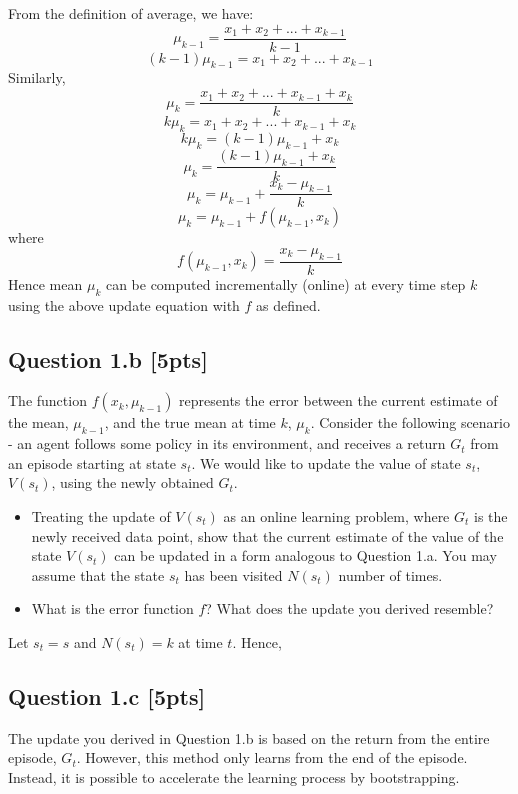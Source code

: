 \documentclass[12pt]{article}
\begin{document}
\noindent
\begin{solution}
From the definition of average, we have:
$$\mu_{k-1} = \frac{x_1 + x_2 + ... + x_{k-1} }{k-1}$$
$$(k-1)\mu_{k-1} = x_1 + x_2 + ... + x_{k-1}$$
Similarly, 
$$\mu_{k} = \frac{x_1 + x_2 + ... + x_{k-1} + x_k}{k}$$
$$k\mu_{k} = x_1 + x_2 + ... + x_{k-1} + x_k$$
$$k\mu_{k} = (k-1)\mu_{k-1} + x_k$$
$$\mu_{k} = \frac{(k-1)\mu_{k-1} + x_k}{k}$$
$$\mu_{k} = \mu_{k-1} + \frac{x_k - \mu_{k-1}}{k}$$
$$\mu_{k} = \mu_{k-1} + f(\mu_{k-1}, x_k)$$
where
$$f(\mu_{k-1}, x_k) = \frac{x_k - \mu_{k-1}}{k}$$
Hence mean $\mu_k$ can be computed  incrementally (online) at every time step $k$ using the above update equation with $f$ as defined.
\end{solution}

\subsection*{Question 1.b \textbf{[5pts]}}
The function $f(x_k, \mu_{k-1})$ represents the error between the current estimate of the mean, $\mu_{k-1}$, and the true mean at time $k$, $\mu_k$. Consider the following scenario - an agent follows some policy in its environment, and receives a return $G_t$ from an episode starting at state $s_t$. We would like to update the value of state $s_t$, $V(s_t)$, using the newly obtained $G_t$. 

\begin{itemize}
    \item Treating the update of $V(s_t)$ as an online learning problem, where $G_t$ is the newly received data point, show that the current estimate of the value of the state $V(s_t)$ can be updated in a form analogous to Question 1.a. You may assume that the state $s_t$ has been visited $N(s_t)$ number of times.
    
    \item What is the error function $f$? What does the update you derived resemble?  
\end{itemize}

\noindent
\begin{solution}
Let $s_t = s$ and $N(s_t) = k$ at time $t$. Hence, 
\end{solution}

\subsection*{Question 1.c \textbf{[5pts]}}
The update you derived in Question 1.b is based on the return from the entire episode, $G_t$. However, this method only learns from the end of the episode. Instead, it is possible to accelerate the learning process by bootstrapping. 
\end{document}
